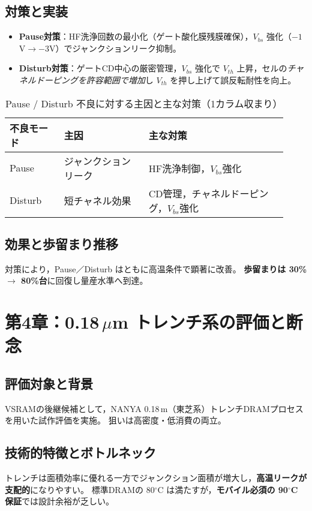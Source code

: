\documentclass[conference]{IEEEtran}
\begin{document}
\subsection{対策と実装}
\begin{itemize}
  \item \textbf{Pause対策}：HF洗浄回数の最小化（ゲート酸化膜残膜確保），\;$V_{bs}$ 強化（$-1$V$\to-3$V）でジャンクションリーク抑制。
  \item \textbf{Disturb対策}：ゲートCD中心の厳密管理，\;$V_{bs}$ 強化で $V_{th}$ 上昇，\;セルの\emph{チャネルドーピングを許容範囲で増加}し $V_{th}$ を押し上げて誤反転耐性を向上。
\end{itemize}

\begin{table}[t]
\centering
\caption{Pause / Disturb 不良に対する主因と主な対策（1カラム収まり）}
\label{tab:countermeasures}
\footnotesize
\begin{tabular}{p{0.18\linewidth} p{0.28\linewidth} p{0.46\linewidth}}
\toprule
不良モード & 主因 & 主な対策 \\
\midrule
Pause   & ジャンクションリーク & HF洗浄制御，$V_{bs}$強化 \\
Disturb & 短チャネル効果       & CD管理，チャネルドーピング，$V_{bs}$強化 \\
\bottomrule
\end{tabular}
\end{table}

\subsection{効果と歩留まり推移}
対策により，Pause／Disturb はともに高温条件で顕著に改善。\;
\textbf{歩留まりは 30\% $\to$ 80\%台}に回復し量産水準へ到達。

\section{第4章：0.18\,\texorpdfstring{$\mu$m}{μm} トレンチ系の評価と断念}

\subsection{評価対象と背景}
VSRAMの後継候補として，NANYA 0.18\,\textmu m（東芝系）トレンチDRAMプロセスを用いた試作評価を実施。
狙いは高密度・低消費の両立。

\subsection{技術的特徴とボトルネック}
トレンチは面積効率に優れる一方でジャンクション面積が増大し，\textbf{高温リークが支配的}になりやすい。
標準DRAMの 80$^\circ$C は満たすが，\textbf{モバイル必須の 90$^\circ$C 保証}では設計余裕が乏しい。
\end{document}
